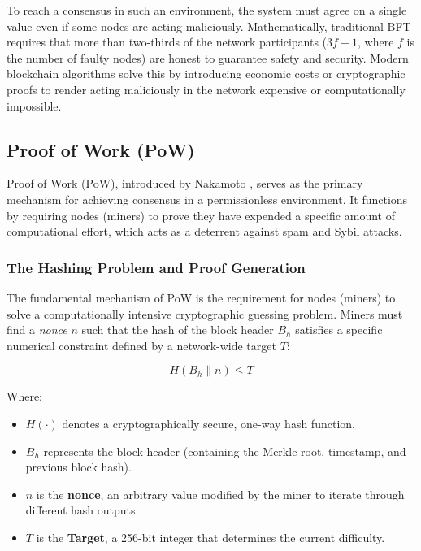 To reach a consensus in such an environment, the system must agree on a single value even if some nodes are acting maliciously. Mathematically, traditional BFT requires that more than two-thirds of the network participants ($3f + 1$, where $f$ is the number of faulty nodes) are honest to guarantee safety and security. Modern blockchain algorithms solve this by introducing economic costs or cryptographic proofs to render acting maliciously in the network expensive or computationally impossible.

\subsection{Proof of Work (PoW)}
Proof of Work (PoW), introduced by Nakamoto \cite{nakamoto2008bitcoin}, serves as the primary mechanism for achieving consensus in a permissionless environment. It functions by requiring nodes (miners) to prove they have expended a specific amount of computational effort, which acts as a deterrent against spam and Sybil attacks.

\subsubsection{The Hashing Problem and Proof Generation}
The fundamental mechanism of PoW is the requirement for nodes (miners) to solve a computationally intensive cryptographic guessing problem. Miners must find a \textit{nonce} $n$ such that the hash of the block header $B_h$ satisfies a specific numerical constraint defined by a network-wide target $T$:

\begin{equation}
    H(B_h \parallel n) \leq T
\end{equation}

Where:
\begin{itemize}
    \item $H(\cdot)$ denotes a cryptographically secure, one-way hash function.
    \item $B_h$ represents the block header (containing the Merkle root, timestamp, and previous block hash).
    \item $n$ is the \textbf{nonce}, an arbitrary value modified by the miner to iterate through different hash outputs.
    \item $T$ is the \textbf{Target}, a 256-bit integer that determines the current difficulty.
\end{itemize}



